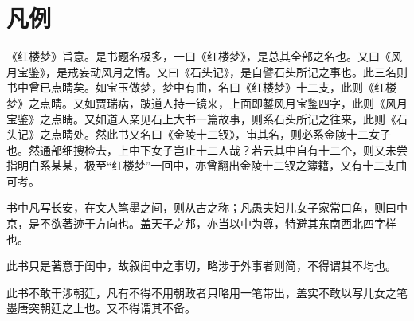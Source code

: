 \chapter*{凡例}

\begin{qute2sp}
    \large
    \begin{parag}
        《红楼梦》旨意。是书题名极多，一曰《红楼梦》，是总其全部之名也。又曰《风月宝鉴》，是戒妄动风月之情。又曰《石头记》，是自譬石头所记之事也。此三名则书中曾已点睛矣。如宝玉做梦，梦中有曲，名曰《红楼梦》十二支，此则《红楼梦》之点睛。又如贾瑞病，跛道人持一镜来，上面即錾风月宝鉴四字，此则《风月宝鉴》之点睛。又如道人亲见石上大书一篇故事，则系石头所记之往来，此则《石头记》之点睛处。然此书又名曰《金陵十二钗》，审其名，则必系金陵十二女子也。然通部细搜检去，上中下女子岂止十二人哉？若云其中自有十二个，则又未尝指明白系某某，极至“红楼梦”一回中，亦曾翻出金陵十二钗之簿籍，又有十二支曲可考。
    \end{parag}

    \begin{parag}
        书中凡写长安，在文人笔墨之间，则从古之称；凡愚夫妇儿女子家常口角，则曰中京，是不欲著迹于方向也。盖天子之邦，亦当以中为尊，特避其东南西北四字样也。
    \end{parag}

    \begin{parag}
        此书只是著意于闺中，故叙闺中之事切，略涉于外事者则简，不得谓其不均也。
    \end{parag}

    \begin{parag}
        此书不敢干涉朝廷，凡有不得不用朝政者只略用一笔带出，盖实不敢以写儿女之笔墨唐突朝廷之上也。又不得谓其不备。
    \end{parag}
\end{qute2sp}

\cleardoublepage
\clearpage